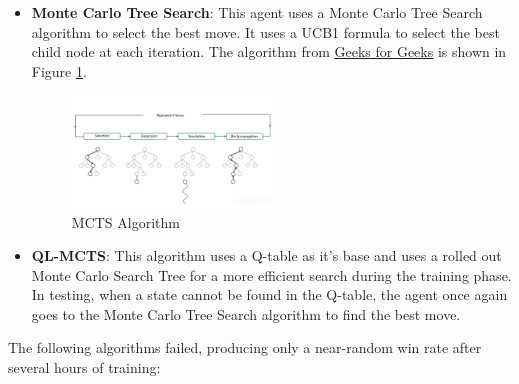 \begin{itemize}
    \item \textbf{Monte Carlo Tree Search}: This agent uses a Monte Carlo Tree Search algorithm to select the best move. It uses a UCB1 formula to select the best child node at each iteration. The algorithm from \href{https://www.geeksforgeeks.org/ml-monte-carlo-tree-search-mcts/}{Geeks for Geeks} is shown in Figure \ref{fig:mcts}.
    \begin{figure}
        \centering
        \includegraphics[width=0.5\textwidth]{images/mcts.png}
        \caption{MCTS Algorithm}
        \label{fig:mcts}
    \end{figure}

    \item \textbf{QL-MCTS}: This algorithm uses a Q-table as it's base and uses a rolled out Monte Carlo Search Tree for a more efficient search during the training phase. In testing, when a state cannot be found in the Q-table, the agent once again goes to the Monte Carlo Tree Search algorithm to find the best move.
\end{itemize}

The following algorithms failed, producing only a near-random win rate after several hours of training:

